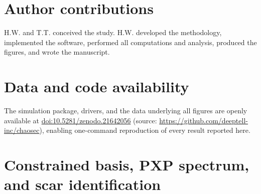 \documentclass[a4paper,11pt,twocolumn,unpublished]{quantumarticle}
\begin{document}

\section*{Author contributions}
H.W. and T.T. conceived the study. H.W. developed the methodology, implemented
the software, performed all computations and analysis, produced the figures,
and wrote the manuscript.

\section*{Data and code availability}
The simulation package, drivers, and the data underlying all figures are openly
available at \href{https://doi.org/10.5281/zenodo.21642056}{doi:10.5281/zenodo.21642056}
(source: \url{https://github.com/deeptell-inc/chaosec}), enabling one-command
reproduction of every result reported here.

\appendix

\section{Constrained basis, PXP spectrum, and scar identification}
\label{app:spectrum}
\end{document}
